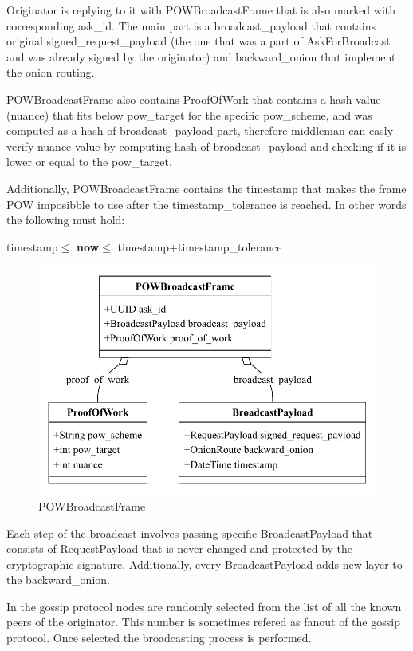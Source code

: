 \documentclass{article}
\begin{document}
Originator is replying to it with POWBroadcastFrame that is also marked with corresponding ask\_id. The main part is a broadcast\_payload that contains original signed\_request\_payload (the one that was a part of AskForBroadcast and was already signed by the originator) and backward\_onion that implement the onion routing.

POWBroadcastFrame also contains ProofOfWork that contains a hash value (nuance) that fits below pow\_target for the specific pow\_scheme, and was computed as a hash of broadcast\_payload part, therefore middleman can easly verify nuance value by computing hash of broadcast\_payload and checking if it is lower or equal to the pow\_target. 

Additionally, POWBroadcastFrame contains the timestamp that makes the frame POW imposibble to use after the timestamp\_tolerance is reached. In other words the following must hold:

\begin{center}
	timestamp$\le$ \textbf{now}$\le$ timestamp+timestamp\_tolerance
\end{center}

\begin{figure}
	\centering
	\includegraphics[scale=0.7]{POWBroadcastFrame.pdf}
	\caption{POWBroadcastFrame}
	\label{fig:fr:powbroadcastframe}
\end{figure}


Each step of the broadcast involves passing specific BroadcastPayload that consists of RequestPayload that is never changed and protected by the cryptographic signature.  Additionally, every BroadcastPayload adds new layer to the backward\_onion.

In the gossip protocol nodes are randomly selected from the list of all the known peers of the originator. This number is sometimes refered as fanout \cite{Fanout} of the gossip protocol. Once selected the broadcasting process is performed.
\end{document}
